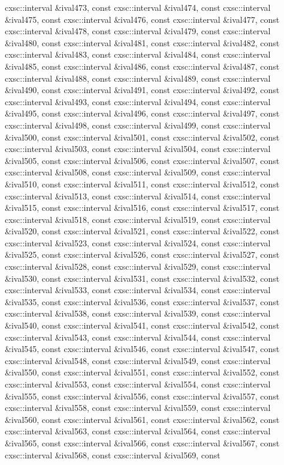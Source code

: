 \begin{DoxyCompactItemize}
cxsc\-::interval \&ival473, const cxsc\-::interval \&ival474, const cxsc\-::interval \&ival475, const cxsc\-::interval \&ival476, const cxsc\-::interval \&ival477, const cxsc\-::interval \&ival478, const cxsc\-::interval \&ival479, const cxsc\-::interval \&ival480, const cxsc\-::interval \&ival481, const cxsc\-::interval \&ival482, const cxsc\-::interval \&ival483, const cxsc\-::interval \&ival484, const cxsc\-::interval \&ival485, const cxsc\-::interval \&ival486, const cxsc\-::interval \&ival487, const cxsc\-::interval \&ival488, const cxsc\-::interval \&ival489, const cxsc\-::interval \&ival490, const cxsc\-::interval \&ival491, const cxsc\-::interval \&ival492, const cxsc\-::interval \&ival493, const cxsc\-::interval \&ival494, const cxsc\-::interval \&ival495, const cxsc\-::interval \&ival496, const cxsc\-::interval \&ival497, const cxsc\-::interval \&ival498, const cxsc\-::interval \&ival499, const cxsc\-::interval \&ival500, const cxsc\-::interval \&ival501, const cxsc\-::interval \&ival502, const cxsc\-::interval \&ival503, const cxsc\-::interval \&ival504, const cxsc\-::interval \&ival505, const cxsc\-::interval \&ival506, const cxsc\-::interval \&ival507, const cxsc\-::interval \&ival508, const cxsc\-::interval \&ival509, const cxsc\-::interval \&ival510, const cxsc\-::interval \&ival511, const cxsc\-::interval \&ival512, const cxsc\-::interval \&ival513, const cxsc\-::interval \&ival514, const cxsc\-::interval \&ival515, const cxsc\-::interval \&ival516, const cxsc\-::interval \&ival517, const cxsc\-::interval \&ival518, const cxsc\-::interval \&ival519, const cxsc\-::interval \&ival520, const cxsc\-::interval \&ival521, const cxsc\-::interval \&ival522, const cxsc\-::interval \&ival523, const cxsc\-::interval \&ival524, const cxsc\-::interval \&ival525, const cxsc\-::interval \&ival526, const cxsc\-::interval \&ival527, const cxsc\-::interval \&ival528, const cxsc\-::interval \&ival529, const cxsc\-::interval \&ival530, const cxsc\-::interval \&ival531, const cxsc\-::interval \&ival532, const cxsc\-::interval \&ival533, const cxsc\-::interval \&ival534, const cxsc\-::interval \&ival535, const cxsc\-::interval \&ival536, const cxsc\-::interval \&ival537, const cxsc\-::interval \&ival538, const cxsc\-::interval \&ival539, const cxsc\-::interval \&ival540, const cxsc\-::interval \&ival541, const cxsc\-::interval \&ival542, const cxsc\-::interval \&ival543, const cxsc\-::interval \&ival544, const cxsc\-::interval \&ival545, const cxsc\-::interval \&ival546, const cxsc\-::interval \&ival547, const cxsc\-::interval \&ival548, const cxsc\-::interval \&ival549, const cxsc\-::interval \&ival550, const cxsc\-::interval \&ival551, const cxsc\-::interval \&ival552, const cxsc\-::interval \&ival553, const cxsc\-::interval \&ival554, const cxsc\-::interval \&ival555, const cxsc\-::interval \&ival556, const cxsc\-::interval \&ival557, const cxsc\-::interval \&ival558, const cxsc\-::interval \&ival559, const cxsc\-::interval \&ival560, const cxsc\-::interval \&ival561, const cxsc\-::interval \&ival562, const cxsc\-::interval \&ival563, const cxsc\-::interval \&ival564, const cxsc\-::interval \&ival565, const cxsc\-::interval \&ival566, const cxsc\-::interval \&ival567, const cxsc\-::interval \&ival568, const cxsc\-::interval \&ival569, const 
\end{DoxyCompactItemize}
